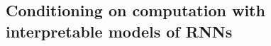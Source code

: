\documentclass[11pt]{article}
\begin{document}
\subsection{Conditioning on computation with interpretable models of RNNs}

\end{document}

